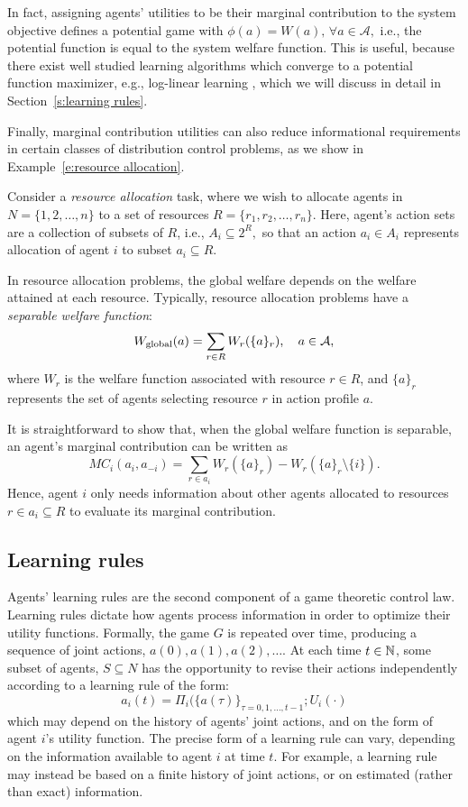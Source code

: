 In fact, assigning agents' utilities to be their marginal contribution to the system objective defines a potential game with $\phi(a) = W(a),\,\forall a\in \mathcal{A},$ i.e., the potential function is equal to the system welfare function. This is useful, because there exist well studied learning algorithms which converge to a potential function maximizer, e.g., log-linear learning \cite{Blume1993}, which we will discuss in detail in Section~\ref{s:learning rules}. 


Finally, marginal contribution utilities can also reduce informational requirements in certain classes of distribution control problems, as we show in  Example~\ref{e:resource allocation}.

\begin{example}
Consider a {\it resource allocation} task, where we wish to allocate agents in $N = \{1,2,\ldots, n\}$ to a set of resources $R = \{r_1,r_2,\ldots,r_n\}$. Here, agent's action sets are a collection of subsets of $R$, i.e., $A_i\subseteq 2^R,$ so that an action $a_i\in A_i$ represents allocation of agent $i$ to subset $a_i\subseteq R.$

In resource allocation problems, the global welfare depends on the welfare attained at each resource. Typically, resource allocation problems have a {\it separable welfare function}:
$$W_{\rm global}(a) = \sum_{r\in R} W_r(\{a\}_r),\quad a\in\mathcal{A},$$
where $W_r$ is the welfare function associated with resource $r\in R$, and $\{a\}_r$ represents the set of agents selecting resource $r$ in action profile $a$. 

It is straightforward to show that, when the global welfare function is separable, an agent's marginal contribution can be written as
$$MC_i(a_i,a_{-i}) = \sum_{r\in a_i}W_r\left(\{a\}_r\right) - W_r\left(\{a\}_r\setminus\{i\}\right).$$
Hence, agent $i$ only needs information about other agents allocated to resources $r\in a_i\subseteq R$ to evaluate its marginal contribution.
\end{example}


\subsection{Learning rules}

Agents' learning rules are the second component of a game theoretic control law. Learning rules dictate how agents process information in order to optimize their utility functions. Formally, the game $G$ is repeated over time, producing a sequence of joint actions, $a(0), a(1),a(2),\ldots.$ At each time $t\in\mathbb{N}$, some subset of agents, $S\subseteq N$ has the opportunity to revise their actions independently according to a learning rule of the form:
$$a_i(t) = \Pi_i(\{a(\tau)\}_{\tau=0,1,\ldots,t-1};U_i(\cdot)$$
which may depend on the history of agents' joint actions, and on the form of agent $i$'s utility function. The precise form of a learning rule can vary, depending on the information available to agent $i$ at time $t$. For example, a learning rule may instead be based on a finite history of joint actions, or on estimated (rather than exact) information.

